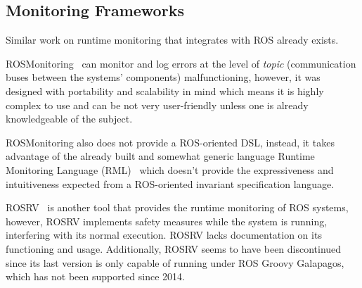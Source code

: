 \subsection{Monitoring Frameworks}
\label{ssec:monitoringframeworks}

Similar work on runtime monitoring that integrates with ROS already exists. 

ROSMonitoring~\cite{ferrando2020rosmonitoring} can monitor and log errors at the level of \textit{topic} (communication buses between the systems' components) malfunctioning, however, it was designed with portability and scalability in mind which means it is highly complex to use and can be not very user-friendly unless one is already knowledgeable of the subject.

ROSMonitoring also does not provide a ROS-oriented DSL, instead, it takes advantage of the already built and somewhat generic language Runtime Monitoring Language (RML)~\cite{rml} which doesn't provide the expressiveness and intuitiveness expected from a ROS-oriented invariant specification language. 

ROSRV~\cite{huang2014rosrv} is another tool that provides the runtime monitoring of ROS systems, however, ROSRV implements safety measures while the system is running, interfering with its normal execution. ROSRV lacks documentation on its functioning and usage. Additionally, ROSRV seems to have been discontinued since its last version is only capable of running under ROS Groovy Galapagos, which has not been supported since 2014.
